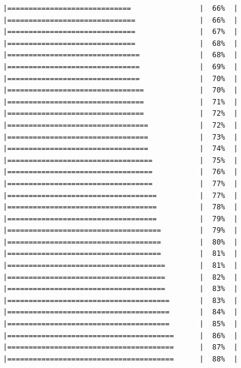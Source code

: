 \documentclass[
  krantz2]{krantz}
\begin{document}
\begin{verbatim}
|=============================                |  66%  |                                                     |==============================               |  66%  |                                                     |==============================               |  67%  |                                                     |==============================               |  68%  |                                                     |===============================              |  68%  |                                                     |===============================              |  69%  |                                                     |===============================              |  70%  |                                                     |================================             |  70%  |                                                     |================================             |  71%  |                                                     |================================             |  72%  |                                                     |=================================            |  72%  |                                                     |=================================            |  73%  |                                                     |=================================            |  74%  |                                                     |==================================           |  75%  |                                                     |==================================           |  76%  |                                                     |==================================           |  77%  |                                                     |===================================          |  77%  |                                                     |===================================          |  78%  |                                                     |===================================          |  79%  |                                                     |====================================         |  79%  |                                                     |====================================         |  80%  |                                                     |====================================         |  81%  |                                                     |=====================================        |  81%  |                                                     |=====================================        |  82%  |                                                     |=====================================        |  83%  |                                                     |======================================       |  83%  |                                                     |======================================       |  84%  |                                                     |======================================       |  85%  |                                                     |=======================================      |  86%  |                                                     |=======================================      |  87%  |                                                     |=======================================      |  88%  |                        
\end{verbatim}
\end{document}
